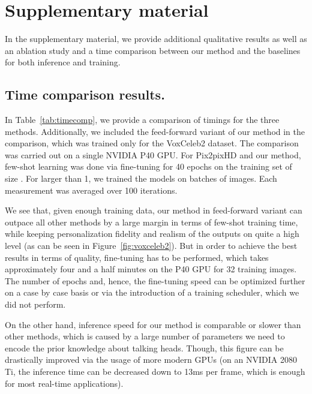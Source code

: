 \documentclass[10pt,twocolumn,letterpaper]{article}
\newcommand{\fig}[1]{Figure~\ref{fig:#1}}
\newcommand{\tab}[1]{Table~\ref{tab:#1}}
\begin{document}
\vfill 
{\small


}

\appendix
\clearpage

\section{Supplementary material}

In the supplementary material, we provide additional qualitative results as well as an ablation study and a time comparison between our method and the baselines for both inference and training.

\subsection{Time comparison results.}

In \tab{timecomp}, we provide a comparison of timings for the three methods. Additionally, we included the feed-forward variant of our method in the comparison, which was trained only for the VoxCeleb2 dataset. The comparison was carried out on a single NVIDIA P40 GPU. For Pix2pixHD and our method, few-shot learning was done via fine-tuning for 40 epochs on the training set of size . For  larger than 1, we trained the models on batches of  images. Each measurement was averaged over 100 iterations.

We see that, given enough training data, our method in feed-forward variant can outpace all other methods by a large margin in terms of few-shot training time, while keeping personalization fidelity and realism of the outputs on quite a high level (as can be seen in \fig{voxceleb2}). But in order to achieve the best results in terms of quality, fine-tuning has to be performed, which takes approximately four and a half minutes on the P40 GPU for 32 training images. The number of epochs and, hence, the fine-tuning speed can be optimized further on a case by case basis or via the introduction of a training scheduler, which we did not perform.

On the other hand, inference speed for our method is comparable or slower than other methods, which is caused by a large number of parameters we need to encode the prior knowledge about talking heads. Though, this figure can be drastically improved via the usage of more modern GPUs (on an NVIDIA 2080 Ti, the inference time can be decreased down to 13ms per frame, which is enough for most real-time applications).
\end{document}
